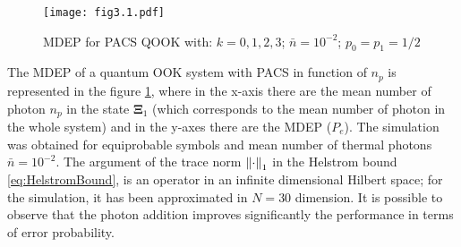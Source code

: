     \begin{figure}[ht]
        \begin{center}
            \texttt{[image: fig3.1.pdf]}
            \caption{MDEP for PACS QOOK with: $k=0,1,2,3$; $\bar{n}=10^{-2}$; $p_0=p_1=1/2$}
            \label{fig:3.1}
        \end{center}
    \end{figure}
    The MDEP of a quantum OOK system with PACS in function of $n_p$ is represented in the figure
    \ref{fig:3.1}, where in the x-axis there are the mean number of photon $n_p$ in the state 
    $\pmb{\Xi}_1$ (which corresponds to the mean number of photon in the whole system) and in the 
    y-axes there are the MDEP ($P_e$). The simulation was obtained for equiprobable symbols and 
    mean number of thermal photons $\bar{n}=10^{-2}$.  
    The argument of the trace norm $\norm{\cdot}_1$ in the Helstrom bound 
    \ref{eq:HelstromBound}, is an operator in an infinite dimensional Hilbert space; for the 
    simulation, it has been approximated in $N=30$ dimension.
    It is possible to observe that the photon addition improves significantly the performance in terms
    of error probability.

